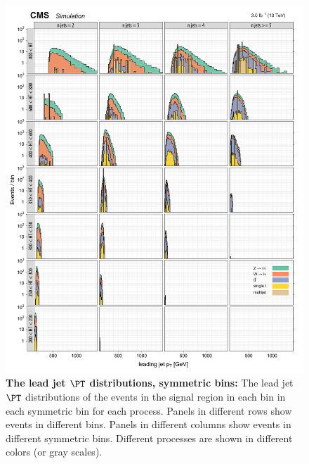 \begin{figure}[!h]
\centering
\includegraphics[scale=0.95]{figures/kiplots/c150107_s150318_f015_jet_pt_0_100}
\caption{\textbf{\boldmath The lead jet $\PT$ distributions, symmetric
\njet bins:} The lead jet $\PT$ distributions of the events in the
signal region in each \scalht bin in each symmetric \njet bin for each
process. Panels in different rows show events in different \scalht bins.
Panels in different columns show events in different symmetric \njet
bins. Different processes are shown in different colors (or gray
scales).} \label{c150107_s150318_f015_jet_pt_0_100}
\end{figure}

